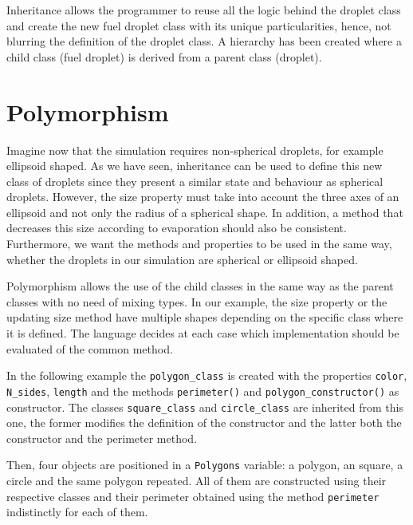 Inheritance allows the programmer to reuse all the logic behind the droplet class 
and create the new fuel droplet class with its unique particularities, hence, not blurring the 
definition of the droplet class.
A hierarchy has been created where a child class (fuel droplet) is derived from a parent class (droplet).




    \section{Polymorphism} 

Imagine now that the simulation requires non-spherical droplets, for example ellipsoid shaped. 
As we have seen, inheritance can be used to define this new class of droplets since they present a similar state and behaviour as spherical droplets.
However, the size property must take into account the three axes of an ellipsoid and not only the radius of a spherical shape. 
In addition, a method that decreases this size according to evaporation should also be consistent. 
Furthermore, we want the methods and properties to be used in the same way, whether the droplets in our simulation are spherical or ellipsoid shaped.

Polymorphism allows the use of the child classes in the same way as the parent classes with no need of mixing types. 
In our example, the size property or the updating size method have multiple shapes depending on the specific class where it is defined. 
The language decides at each case which implementation should be evaluated of the common method.
 


In the following example the \texttt{polygon\_class} is created with 
the properties \texttt{color}, \texttt{N\_sides}, \texttt{length} and 
the methods \texttt{perimeter()} and \texttt{polygon\_constructor()} as constructor. 
The classes \texttt{square\_class} and \texttt{circle\_class} are inherited from this one, 
the former modifies the definition of the constructor and 
the latter both the constructor and the perimeter method. 

Then, four objects are positioned in a \texttt{Polygons} variable: a polygon, an square, a circle and the same polygon repeated. 
All of them are constructed using their respective classes and their perimeter obtained using the method \texttt{perimeter} indistinctly for each of them.


    \newpage 
